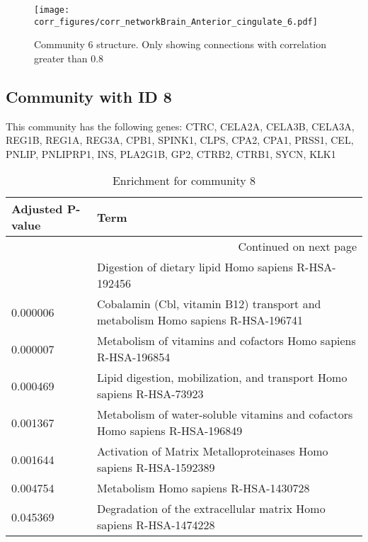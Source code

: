 \begin{figure}[h!]
\centering
\texttt{[image: corr\_figures/corr\_networkBrain\_Anterior\_cingulate\_6.pdf]}
\caption{Community 6 structure. Only showing connections with correlation greater than 0.8}
\end{figure}




\subsection*{Community with ID 8}
This community has the following genes: CTRC, CELA2A, CELA3B, CELA3A, REG1B, REG1A, REG3A, CPB1, SPINK1, CLPS, CPA2, CPA1, PRSS1, CEL, PNLIP, PNLIPRP1, INS, PLA2G1B, GP2, CTRB2, CTRB1, SYCN, KLK1
\\
\begin{longtable}{p{2.4cm}p{14.5cm}}
\caption{Enrichment for community 8}\\
\toprule
Adjusted \newline P-value &                                                                             Term \\
\midrule
\endhead
\midrule
\multicolumn{2}{r}{{Continued on next page}} \\
\midrule
\endfoot

\bottomrule
\endlastfoot
                 0.000005 &                             Digestion of dietary lipid Homo sapiens R-HSA-192456 \\
                 0.000006 &  Cobalamin (Cbl, vitamin B12) transport and metabolism Homo sapiens R-HSA-196741 \\
                 0.000007 &                   Metabolism of vitamins and cofactors Homo sapiens R-HSA-196854 \\
                 0.000469 &            Lipid digestion, mobilization, and transport Homo sapiens R-HSA-73923 \\
                 0.001367 &     Metabolism of water-soluble vitamins and cofactors Homo sapiens R-HSA-196849 \\
                 0.001644 &               Activation of Matrix Metalloproteinases Homo sapiens R-HSA-1592389 \\
                 0.004754 &                                            Metabolism Homo sapiens R-HSA-1430728 \\
                 0.045369 &               Degradation of the extracellular matrix Homo sapiens R-HSA-1474228 \\
\end{longtable}


